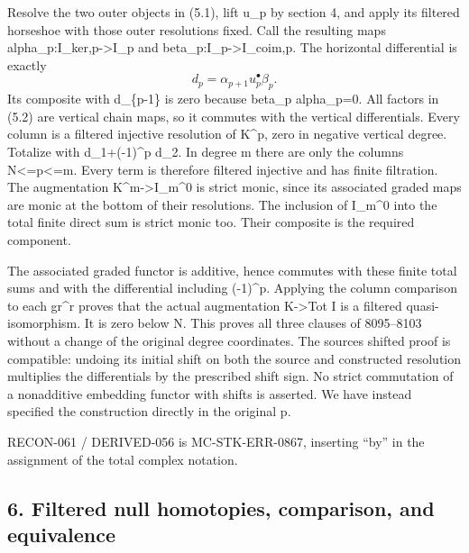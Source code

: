 Resolve the two outer objects in (5.1)\allowbreak{},\allowbreak{} lift u\_\allowbreak{}p by section 4,\allowbreak{} and apply its filtered horseshoe with those outer resolutions fixed. Call the resulting maps alpha\_\allowbreak{}p:\allowbreak{}I\_\allowbreak{}ker,\allowbreak{}p\allowbreak{}->I\_\allowbreak{}p and beta\_\allowbreak{}p:\allowbreak{}I\_\allowbreak{}p\allowbreak{}->I\_\allowbreak{}coim,\allowbreak{}p. The horizontal differential is exactly \[
 d_p=\alpha_{p+1}u_p^\bullet\beta_p.                          \tag{5.2}
\] Its composite with d\_\allowbreak{}\{p-1\} is zero because beta\_\allowbreak{}p alpha\_\allowbreak{}p\allowbreak{}=0. All factors in (5.2)\allowbreak{} are vertical chain maps,\allowbreak{} so it commutes with the vertical differentials. Every column is a filtered injective resolution of K\textasciicircum{}p,\allowbreak{} zero in negative vertical degree. Totalize with d\_\allowbreak{}1\allowbreak{}+(-1)\allowbreak{}\textasciicircum{}p d\_\allowbreak{}2. In degree m there are only the columns N<\allowbreak{}=p<\allowbreak{}=m. Every term is therefore filtered injective and has finite filtration. The augmentation K\textasciicircum{}m\allowbreak{}->I\_\allowbreak{}m\textasciicircum{}0 is strict monic,\allowbreak{} since its associated graded maps are monic at the bottom of their resolutions. The inclusion of I\_\allowbreak{}m\textasciicircum{}0 into the total finite direct sum is strict monic too. Their composite is the required component.

The associated graded functor is additive,\allowbreak{} hence commutes with these finite total sums and with the differential including (-1)\allowbreak{}\textasciicircum{}p. Applying the column comparison to each gr\^{}r proves that the actual augmentation K\allowbreak{}->Tot I is a filtered quasi-isomorphism. It is zero below N. This proves all three clauses of 8095–\allowbreak{}8103 without a change of the original degree coordinates. The source\textquotesingle s shifted proof is compatible:\allowbreak{} undoing its initial shift on both the source and constructed resolution multiplies the differentials by the prescribed shift sign. No strict commutation of a nonadditive embedding functor with shifts is asserted. We have instead specified the construction directly in the original p.

RECON-061 /\allowbreak{} DERIVED-056 is MC-STK-ERR-0867,\allowbreak{} inserting ``by'' in the assignment of the total complex notation.

\subsection{\texorpdfstring{6. Filtered null homotopies,\allowbreak{} comparison,\allowbreak{} and equivalence}{6. Filtered null   and equivalence}}\label{proofs-7589-8350-filtered-null-homotopies-comparison-and-equivalence}

